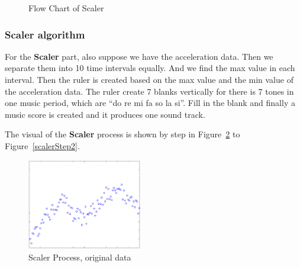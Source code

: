 \begin{figure}[H]
\begin{minipage}[b]{0.5\linewidth}
\caption{Flow Chart of Scaler}
\label{FlowMatcher}
\vspace{4ex}
\end{minipage}%
\end{figure}

\subsubsection{Scaler algorithm}

   For the \textbf{Scaler} part, also suppose we have the acceleration data.
   Then we separate them into 10 time intervals equally.
   And we find the max value in each interval.
   Then the ruler is created based on the max value and the min value of the
   acceleration data.
   The ruler create 7 blanks vertically for there is 7 tones in one music
   period, which are ``do re mi fa so la si''.
   Fill in the blank and finally a music score is created and it produces one
   sound track.

   The visual of the \textbf{Scaler} process is shown by step in
   Figure~\ref{scalerStep0} to Figure~\ref{scalerStep2}.  

\begin{figure}[H]
\centering
\newcommand{\widthOfScalerStepFigure}{5cm}
\includegraphics[width=\widthOfScalerStepFigure]{figWR/scaler0}
\caption{Scaler Process, original data}
\label{scalerStep0}
\end{figure}

